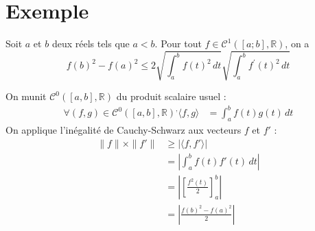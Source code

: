 \documentclass[../main.tex]{subfiles}
\begin{document}
\section{Exemple}
\begin{tcolorbox}[title=Exemple 34.18, title filled=false, colframe=darkgreen, colback=darkgreen!10!white]
    Soit $a$ et $b$ deux réels tels que $a<b$. Pour tout $f \in \mathcal{C}^1([a ; b], \mathbb{R})$, on a
    $$f(b)^2-f(a)^2 \leq 2 \sqrt{\int_a^b f(t)^2 \,dt} \sqrt{\int_a^b f^{\prime}(t)^2 \,dt}$$
\end{tcolorbox}

\noindent On munit $\mathcal{C}^0([a, b], \mathbb{R})$ du produit scalaire usuel : 
\begin{align*}
    \forall (f, g)\in \mathcal{C}^0([a, b], \mathbb{R})^, \langle f, g \rangle &= \int_{a}^{b} f(t) g(t) \,dt
\end{align*}
On applique l'inégalité de Cauchy-Schwarz aux vecteurs $f$ et $f'$ : 
\begin{align*}
    \|f\|\times \|f'\| &\geq |\langle f, f'\rangle| \\
    &= \left| \int_{a}^{b} f(t) f'(t) \,dt \right| \\
    &= \left| \left[ \frac{f^2(t)}{2} \right]_a^b \right| \\
    &= \left|  \frac{f(b)^2 - f(a)^2}{2} \right|
\end{align*}
\end{document}
